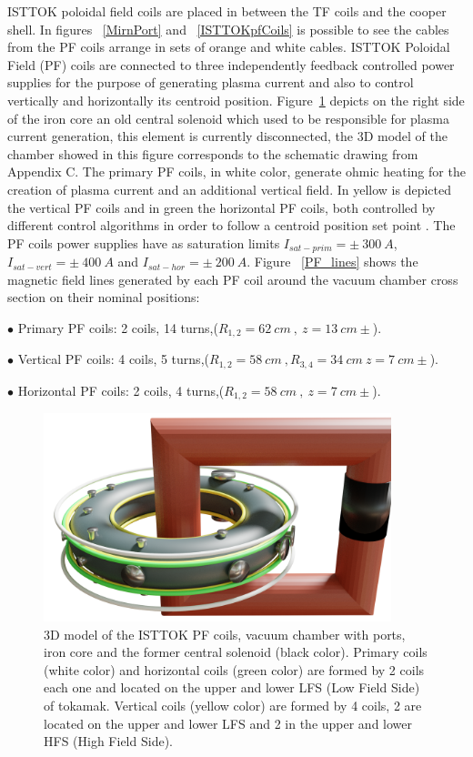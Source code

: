 ISTTOK poloidal field coils are placed in between the TF coils and the cooper shell. In figures ~\ref{MirnPort} and ~\ref{ISTTOKpfCoils} is possible to see the cables from the PF coils arrange in sets of orange and white cables. ISTTOK Poloidal Field (PF) coils are connected to three independently feedback controlled power supplies for the purpose of generating plasma current and also to control vertically and horizontally its centroid position. Figure~\ref{PF_coils} depicts on the right side of the iron core an  old central solenoid which used to be responsible for plasma current generation, this element is currently disconnected, the 3D model of the chamber showed in this figure corresponds to the schematic drawing from Appendix C.  The primary PF coils, in white color, generate ohmic heating for the creation of plasma current and an additional vertical field. In yellow is depicted the vertical PF coils and in green the horizontal PF coils, both controlled by different control algorithms in order to follow a centroid position set point \cite{IvoPID}. The PF coils power supplies have as saturation limits $I_{sat-prim}=\pm~ 300~A$, $I_{sat-vert}=\pm~ 400~A$ and $I_{sat-hor}=\pm~ 200~A$. Figure ~\ref{PF_lines} shows the magnetic field lines generated by each PF coil around the vacuum chamber cross section on their nominal positions:\smallskip

$\bullet$ Primary PF coils: 2 coils, 14 turns,($R_{1,2}=62 ~cm~,~z=13 ~cm\pm$).
\smallskip

$\bullet$ Vertical PF coils: 4 coils, 5 turns,($R_{1,2}=58 ~cm~, R_{3,4}=34 ~cm ~z=7 ~cm\pm$).
\smallskip

$\bullet$ Horizontal PF coils: 2 coils, 4 turns,($R_{1,2}=58 ~cm~, ~z=7 ~cm\pm$).
\smallskip

\begin{figure}[htbp]
	\centering
	\includegraphics[width=0.9\textwidth]{Chp4/ist_coils.png}
	\caption{ 3D model of the ISTTOK PF coils, vacuum chamber with ports, iron core and the former central solenoid (black color). Primary coils (white color) and horizontal coils (green color) are formed by 2 coils each one and located on the  upper and lower LFS (Low Field Side) of tokamak. Vertical coils (yellow color) are formed by 4 coils, 2 are located on the upper and lower LFS and 2 in the upper and lower HFS (High Field Side). \label{PF_coils}  }
\end{figure}

